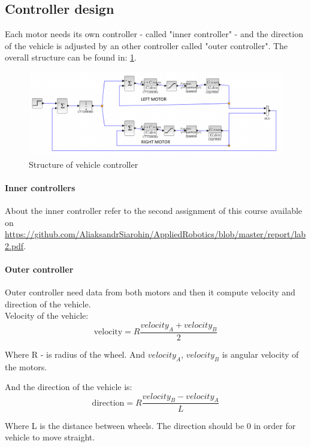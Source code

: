 \documentclass[a4paper,12pt,oneside]{article}
\begin{document}
\subsection{Controller design}
Each motor needs its own controller - called "inner controller" - and the direction of the vehicle is adjusted by an other controller called "outer controller". The overall structure can be found in: \cref{fig:diagram}.
\begin{figure}[h]
	\centering
	\includegraphics[width=\columnwidth]{vehicle.png}
	\caption{Structure of vehicle controller}
	\label{fig:diagram}
\end{figure}
\paragraph{Inner controllers}
About the inner controller refer to the second assignment of this course available on \url{https://github.com/AliaksandrSiarohin/AppliedRobotics/blob/master/report/lab2.pdf}.\\
\paragraph{Outer controller}
Outer controller need data from both motors and then it compute velocity and direction of the vehicle.\\
Velocity of the vehicle:
\begin{equation}
\text{velocity} = R \frac{velocity_A + velocity_B}{2} 
\end{equation}

Where R - is radius of the wheel. And $velocity_A$, $velocity_B$ is angular velocity of the motors. 

And the direction of the vehicle is:
\begin{equation}
\text{direction} = R \frac{velocity_B - velocity_A}{L}
\end{equation}

Where L is the distance between wheels. The direction should be 0 in order for vehicle to move straight.
\end{document}
